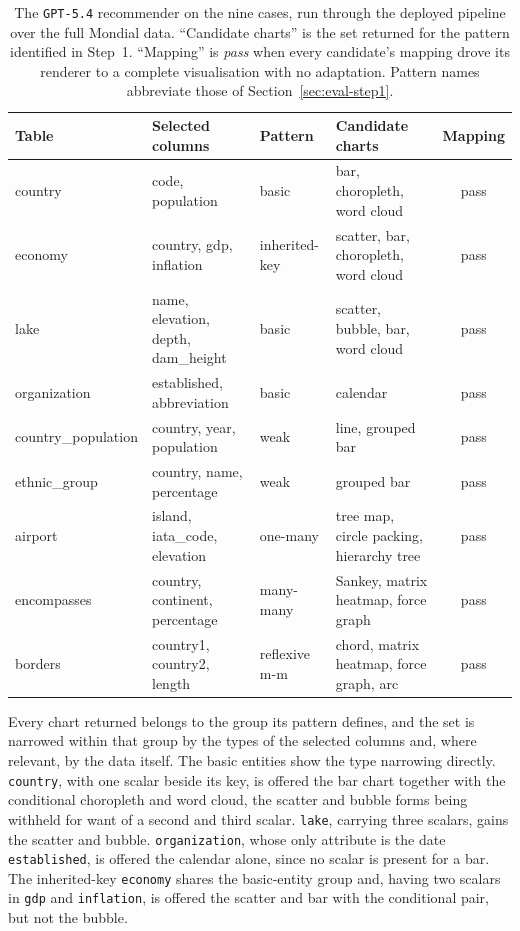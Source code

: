 \begin{table}[htbp]
\centering
\caption{The \texttt{GPT-5.4} recommender on the nine cases, run through the deployed pipeline over the full Mondial data. ``Candidate charts'' is the set returned for the pattern identified in Step~1. ``Mapping'' is \emph{pass} when every candidate's mapping drove its renderer to a complete visualisation with no adaptation. Pattern names abbreviate those of Section~\ref{sec:eval-step1}.}
\label{tab:eval-step2}
\footnotesize
\renewcommand{\arraystretch}{1.25}
\begin{tabularx}{\textwidth}{@{}l l l >{\raggedright\arraybackslash}X c@{}}
\toprule
\textbf{Table} & \textbf{Selected columns} & \textbf{Pattern} & \textbf{Candidate charts} & \textbf{Mapping} \\
\midrule
country & code, population & basic & bar, choropleth, word cloud & pass \\
economy & country, gdp, inflation & inherited-key & scatter, bar, choropleth, word cloud & pass \\
lake & name, elevation, depth, dam\_height & basic & scatter, bubble, bar, word cloud & pass \\
organization & established, abbreviation & basic & calendar & pass \\
country\_population & country, year, population & weak & line, grouped bar & pass \\
ethnic\_group & country, name, percentage & weak & grouped bar & pass \\
airport & island, iata\_code, elevation & one-many & tree map, circle packing, hierarchy tree & pass \\
encompasses & country, continent, percentage & many-many & Sankey, matrix heatmap, force graph & pass \\
borders & country1, country2, length & reflexive m-m & chord, matrix heatmap, force graph, arc & pass \\
\bottomrule
\end{tabularx}
\end{table}

Every chart returned belongs to the group its pattern defines, and the set is narrowed within that group by the types of the selected columns and, where relevant, by the data itself. The basic entities show the type narrowing directly. \texttt{country}, with one scalar beside its key, is offered the bar chart together with the conditional choropleth and word cloud, the scatter and bubble forms being withheld for want of a second and third scalar. \texttt{lake}, carrying three scalars, gains the scatter and bubble. \texttt{organization}, whose only attribute is the date \texttt{established}, is offered the calendar alone, since no scalar is present for a bar. The inherited-key \texttt{economy} shares the basic-entity group and, having two scalars in \texttt{gdp} and \texttt{inflation}, is offered the scatter and bar with the conditional pair, but not the bubble.

